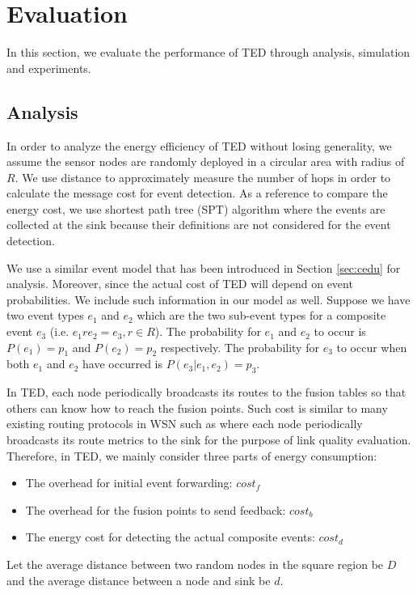 \section{Evaluation}
\label{sec:ceduevaluation}
In this section, we evaluate the performance of TED through analysis, simulation and experiments.

\subsection{Analysis}
\label{sec:ceduanalysis}
In order to analyze the energy efficiency of TED without losing generality, we assume the sensor nodes are randomly deployed in a circular area with radius of \(R\). We use distance to approximately measure the number of hops in order to calculate the message cost for event detection. As a reference to compare the energy cost, we use shortest path tree (SPT) algorithm where the events are collected at the sink because their definitions are not considered for the event detection.

We use a similar event model that has been introduced in Section \ref{sec:cedu} for analysis. Moreover, since the actual cost of TED will depend on event probabilities. We include such information in our model as well. Suppose we have two event types \(e_1\) and \(e_2\) which are the two sub-event types for a composite event \(e_3\) (i.e. \(e_1re_2=e_3, r\in R\)). The probability for \(e_1\) and \(e_2\) to occur is \(P(e_1)=p_1\) and \(P(e_2)=p_2\) respectively. The probability for \(e_3\) to occur when both \(e_1\) and \(e_2\) have occurred is \(P(e_3|e_1, e_2)=p_3\).

In TED, each node periodically broadcasts its routes to the fusion tables so that others can know how to reach the fusion points. Such cost is similar to many existing routing protocols in WSN such as \cite{rssiroute} where each node periodically broadcasts its route metrics to the sink for the purpose of link quality evaluation. Therefore, in TED, we mainly consider three parts of energy consumption:
\begin{itemize}
\item The overhead for initial event forwarding: \(cost_f\)
\item The overhead for the fusion points to send feedback: \(cost_b\)
\item The energy cost for detecting the actual composite events: \(cost_d\)
\end{itemize}

Let the average distance between two random nodes in the square region be \(D\) and the average distance between a node and sink be \(d\). 
\begin{comment}
Then:
\begin{equation*}
D=\frac{2+\sqrt{2}+5\times ln(1+\sqrt{}2)}{15}\times|N|
\end{equation*}
Let the average distance between the event source and the event fusion points be \(d\).
\end{comment}

